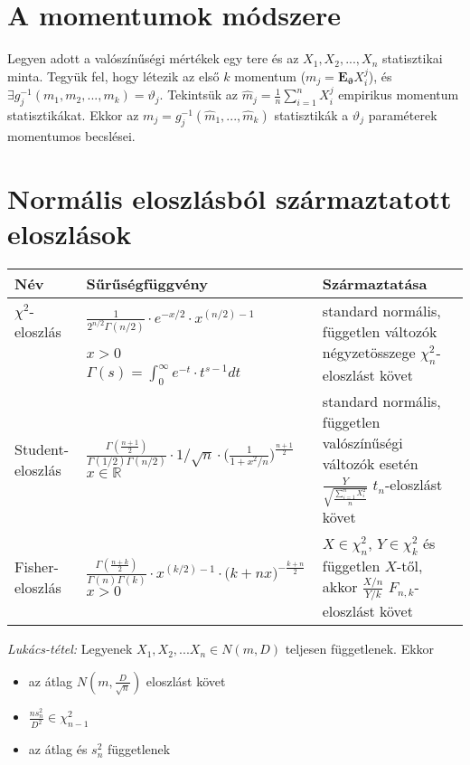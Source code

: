 \section{A momentumok módszere}

Legyen adott a valószínűségi mértékek egy tere és az $X_1, X_2, ..., X_n$ statisztikai minta. Tegyük fel, hogy létezik az első $k$ momentum ($m_j = \mathbf{E}_\mathbf{\vartheta}X_i^j$), és $\exists g_j^{-1}(m_1, m_2, ..., m_k) = \vartheta_j$. Tekintsük az $\hat{m}_j=\frac{1}{n}\sum_{i=1}^nX_i^j$ empirikus momentum statisztikákat. Ekkor az $m_j = g_j^{-1}(\hat{m}_1,..., \hat{m}_k)$ statisztikák a $\vartheta_j$ paraméterek momentumos becslései.

\section{Normális eloszlásból származtatott eloszlások}

\begin{table}[h]
\centering
\begin{tabular}{|p{2.7cm}|p{5.8cm}|p{5cm}|}
\hline
Név & Sűrűségfüggvény & Származtatása
\\ \hline
$\chi^2$-eloszlás & $ \frac{1}{2^{n/2}\Gamma(n/2)} \cdot e^{-x/2} \cdot x^{(n/2)-1}$ & \multirow{3}{5cm}{standard normális, független változók négyzetösszege $\chi^2_n$-eloszlást követ} \\
&  $ x>0 $ & \\
 & $\Gamma(s) = \int_0^\infty e^{-t} \cdot t^{s-1} dt$ &
\\ \hline
Student-eloszlás & $\frac{\Gamma(\frac{n+1}{2})}{\Gamma(1/2)\Gamma(n/2)} \cdot 1/\sqrt{n} \cdot \Big(\frac{1}{1+x^2/n} \Big)^{\frac{n+1}{2}}$ $x \in \mathbb{R}$ & standard normális, független valószínűségi változók esetén $\frac{Y}{\sqrt{\frac{\sum_{i=1}^{n}X_i^2}{n}}}$ $t_n$-eloszlást követ
\\ \hline
Fisher-eloszlás & $\frac{\Gamma(\frac{n+k}{2})}{\Gamma(n)\Gamma(k)} \cdot x^{(k/2)-1} \cdot \Big(k+nx \Big)^{-\frac{k+n}{2}}$ $x > 0$ & $X \in \chi^2_n$, $Y \in \chi^2_k$ és független $X$-től, akkor $\frac{X/n}{Y/k}$ $F_{n,k}$-eloszlást követ
\\ \hline
\end{tabular}
\end{table}

\emph{Lukács-tétel:} Legyenek $X_1, X_2,...X_n \in N(m,D)$ teljesen függetlenek. Ekkor
\begin{itemize}
\item az átlag $N(m,\frac{D}{\sqrt{n}})$ eloszlást követ
\item $\frac{ns_n^2}{D^2} \in \chi_{n-1}^2$
\item az átlag és $s_n^2$ függetlenek
\end{itemize} 

